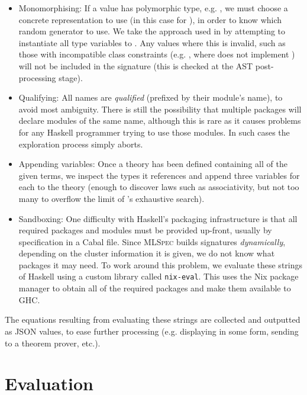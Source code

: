 \begin{itemize}
\item{Monomorphising}: If a value has polymorphic type, e.g. , we must choose a concrete representation to use (in this
  case for ), in order to know which random generator to use. We take the
  approach used in \qcheck{} by attempting to instantiate all type variables to
  . Any values where this is invalid, such as those with
  incompatible class constraints (e.g. , where
   does not implement ) will not be included in the
  signature (this is checked at the AST post-processing stage).

\item{Qualifying}: All names are \emph{qualified} (prefixed by their module's
  name), to avoid most ambiguity. There is still the possibility that multiple
  packages will declare modules of the same name, although this is rare as it
  causes problems for any Haskell programmer trying to use those modules. In
  such cases the exploration process simply aborts.

\item{Appending variables}: Once a \qspec{} theory has been defined containing
  all of the given terms, we inspect the types it references and append three
  variables for each to the theory (enough to discover laws such as
  associativity, but not too many to overflow the limit of \qspec{}'s exhaustive
  search).

\item{Sandboxing}: One difficulty with Haskell's packaging infrastructure is
  that all required packages and modules must be provided up-front, usually by
  specification in a Cabal file. Since \textsc{MLSpec} builds signatures
  \emph{dynamically}, depending on the cluster information it is given, we do
  not know what packages it may need. To work around this problem, we evaluate
  these strings of Haskell using a custom library called \texttt{nix-eval}. This
  uses the Nix package manager to obtain all of the required packages and make
  them available to GHC.

\end{itemize}

The equations resulting from evaluating these strings are collected and
outputted as JSON values, to ease further processing (e.g. displaying in some
form, sending to a theorem prover, etc.).

\section{Evaluation}
\label{sec:evaluation}
\iffalse

